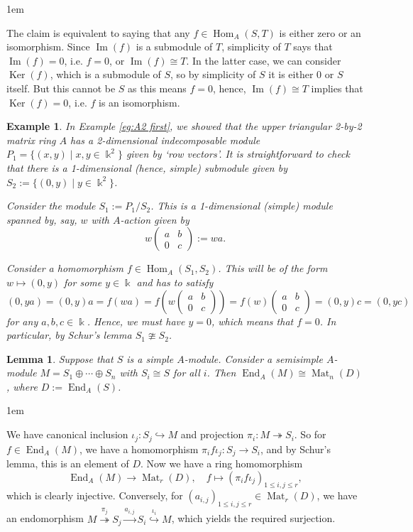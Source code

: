 \documentclass[11pt,a4paper]{article}
\makeatletter
\numberwithin{equation}{section}
\renewenvironment{proof}[1][\proofname]{\par
    \pushQED{\qed}%
    \normalfont \topsep0\p@\@plus6\p@ \labelsep1em\relax
    \trivlist
    \item[\hskip\labelsep\indent
        \bfseries #1]\ignorespaces
    \mbox{}
}{
    \popQED\endtrivlist\@endpefalse
}
\theoremstyle{all}
\newtheorem{lemma}[theorem]{Lemma}
\newtheorem{example}[theorem]{Example}
\theoremstyle{remark}
\DeclareMathOperator{\onto}{\twoheadrightarrow}
\DeclareMathOperator{\into}{\hookrightarrow}
\newcommand{\Hom}{\operatorname{Hom}\nolimits}
\newcommand{\End}{\operatorname{End}\nolimits}
\renewcommand{\Im}{\operatorname{Im}\nolimits}
\newcommand{\Ker}{\operatorname{Ker}\nolimits}
\newcommand{\Mat}{\operatorname{Mat}\nolimits}
\makeatother
\begin{document}
\begin{proof}
The claim is equivalent to saying that any $f\in\Hom_A(S,T)$ is either zero or an isomorphism.
Since $\Im(f)$ is a submodule of $T$, simplicity of $T$ says that $\Im(f)=0$, i.e. $f=0$, or $\Im(f)\cong T$.
In the latter case, we can consider $\Ker(f)$, which is a submodule of $S$, so by simplicity of $S$ it is either $0$ or $S$ itself.
But this cannot be $S$ as this means $f=0$, hence, $\Im(f)\cong T$ implies that $\Ker(f)=0$, i.e. $f$ is an isomorphism.
\end{proof}

\begin{example}
In Example \ref{eg:A2 first}, we showed that the upper triangular 2-by-2 matrix ring $A$ has a 2-dimensional indecomposable module $P_1=\{(x,y)\mid x,y\in\Bbbk^2 \}$ given by `row vectors'.
It is straightforward to check that there is a 1-dimensional (hence, simple) submodule given by $S_2:=\{(0,y)\mid y\in\Bbbk^2\}$.

Consider the module $S_1:=P_1/S_2$.  This is a 1-dimensional (simple) module spanned by, say, $w$ with $A$-action given by 
\[
w\begin{pmatrix}
a&b\\ 0&c 
\end{pmatrix} := wa.
\]

Consider a homomorphism $f\in \Hom_A(S_1,S_2)$.
This will be of the form $w\mapsto (0,y)$ for some $y \in \Bbbk$ and has to satisfy
\[
(0,ya)=(0,y)a=f(wa)=f( w \begin{pmatrix}
a&b\\ 0&c 
\end{pmatrix} ) = f(w)\begin{pmatrix}
a&b\\ 0&c 
\end{pmatrix} = (0,y)c = (0,yc)
\]
for any $a,b,c\in \Bbbk$.
Hence, we must have $y=0$, which means that $f=0$.
In particular, by Schur's lemma $S_1\ncong S_2$.
\end{example}

\begin{lemma}\label{lem:endo ss}
Suppose that $S$ is a simple $A$-module.
Consider a semisimple $A$-module $M=S_1\oplus \cdots \oplus S_n$ with $S_i\cong S$ for all $i$.
Then $\End_A(M)\cong \Mat_{n}(D)$, where $D:=\End_A(S)$.
\end{lemma}
\begin{proof}
We have canonical inclusion $\iota_j: S_j\into M$ and projection $\pi_i:M\onto S_i$.  So for $f\in \End_A(M)$, we have a homomorphism $\pi_i f \iota_j: S_j\to S_i$, and by Schur's lemma, this is an element of $D$.  Now we have a ring homomorphism
\[
\End_A(M) \to \Mat_r(D), \quad f\mapsto (\pi_i f \iota_j)_{1\leq i,j\leq r},
\]
which is clearly injective.
Conversely, for $(a_{i,j})_{1\leq i,j\leq r}\in\Mat_{r}(D)$, we have an endomorphism $M\stackrel{\pi_j}{\onto} S_j \stackrel{a_{i,j}}{\to} S_i \stackrel{\iota_i}{\into} M$, which yields the required surjection.
\end{proof}
\end{document}
